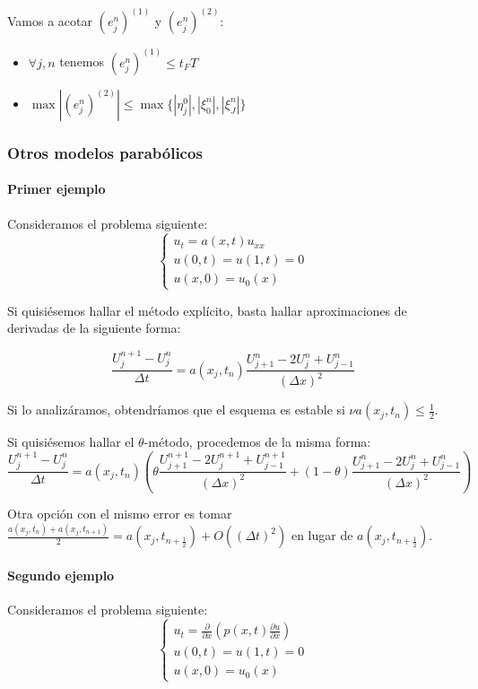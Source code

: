 Vamos a acotar $(e_j^n)^{(1)}$ y $(e_j^n)^{(2)}$:
\begin{itemize}
	\item $\forall j,n$ tenemos $(e_j^n)^{(1)} \le t_F T$
	\item $\max|(e_j^n)^{(2)}| \le \max\{|\eta_j^0|,|\xi_0^n|,|\xi_J^n|\}$
\end{itemize}

\subsubsection{Otros modelos parabólicos}

\paragraph{Primer ejemplo}\mbox{}

Consideramos el problema siguiente:
\begin{equation*}
	\left\{
	\begin{array}{l}
		u_t = a(x,t)u_{xx}\\
		u(0,t) = u(1,t) = 0\\
		u(x,0) = u_0(x)
	\end{array}
	\right.
\end{equation*}

Si quisiésemos hallar el método explícito, basta hallar aproximaciones de derivadas de la siguiente forma:

$$\frac{U_{j}^{n+1}-U_{j}^{n}}{\Delta t} = a(x_j, t_n)\frac{U_{j+1}^{n}-2U_{j}^{n}+U_{j-1}^{n}}{(\Delta x )^2}$$

Si lo analizáramos, obtendríamos que el esquema es estable si $\nu a(x_j, t_n) \le \frac{1}{2}$.

Si quisiésemos hallar el $\theta$-método, procedemos de la misma forma:
$$\frac{U_{j}^{n+1}-U_{j}^{n}}{\Delta t} = a(x_j, t_n)\left(\theta\frac{U_{j+1}^{n+1}-2U_{j}^{n+1}+U_{j-1}^{n+1}}{(\Delta x )^2} + (1-\theta)\frac{U_{j+1}^{n}-2U_{j}^{n}+U_{j-1}^{n}}{(\Delta x )^2}\right)$$

Otra opción con el mismo error es tomar $\frac{a(x_j, t_n) + a(x_j, t_{n+1})}{2} = a(x_j, t_{n+\frac{1}{2}}) + O((\Delta t)^2)$ en lugar de $a(x_j, t_{n+\frac{1}{2}})$.

\paragraph{Segundo ejemplo}\mbox{}

Consideramos el problema siguiente:
\begin{equation*}
	\left\{
	\begin{array}{l}
		u_t = \frac{\partial}{\partial x}\left(p(x,t)\frac{\partial u}{\partial x}\right)\\
		u(0,t) = u(1,t) = 0\\
		u(x,0) = u_0(x)
	\end{array}
	\right.
\end{equation*}
	

